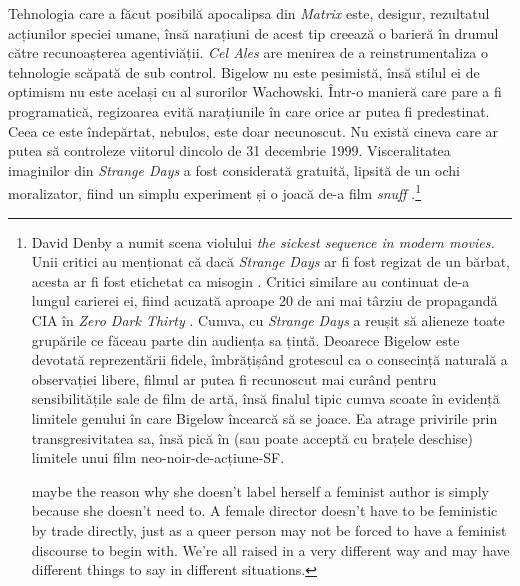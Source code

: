 \documentclass[12pt]{article}
\begin{document}
Tehnologia care a făcut posibilă apocalipsa din \textit{Matrix} este, desigur, rezultatul acțiunilor speciei umane, însă narațiuni de acest tip creează o barieră în drumul către recunoașterea agentiviății. \textit{Cel Ales} are menirea de a reinstrumentaliza o tehnologie scăpată de sub control. Bigelow nu este pesimistă, însă stilul ei de optimism nu este același cu al surorilor Wachowski. Într-o manieră care pare a fi programatică, regizoarea evită narațiunile în care orice ar putea fi predestinat. Ceea ce este îndepărtat, nebulos, este doar necunoscut. Nu există cineva care ar putea să controleze viitorul dincolo de 31 decembrie 1999. Visceralitatea imaginilor din \textit{Strange Days} a fost considerată gratuită, lipsită de un ochi moralizator, fiind un simplu experiment și o joacă de-a film \textit{snuff} \cite{Guthmann1995a, DenbyPeopleStrange1995}.\footnote{David Denby a numit scena violului \textit{the sickest sequence in modern movies.} Unii critici au menționat că dacă \textit{Strange Days} ar fi fost regizat de un bărbat, acesta ar fi fost etichetat ca misogin \cite{MirasolBigelowUncanny2010}. Critici similare au continuat de-a lungul carierei ei, fiind acuzată aproape 20 de ani mai târziu de propagandă CIA în \textit{Zero Dark Thirty} \cite{Vishnevetsky2012a}. Cumva, cu \textit{Strange Days} a reușit să alieneze toate grupările ce făceau parte din audiența sa țintă. Deoarece Bigelow este devotată reprezentării fidele, îmbrățișând grotescul ca o consecință naturală a observației libere, filmul ar putea fi recunoscut mai curând pentru sensibilitățile sale de film de artă, însă finalul tipic cumva scoate în evidență limitele genului în care Bigelow încearcă să se joace. Ea atrage privirile prin transgresivitatea sa, însă pică în (sau poate acceptă cu brațele deschise) limitele unui film neo-noir-de-acțiune-SF.\par

maybe the reason why she doesn't label herself a feminist author is simply because she doesn't need to. A female director doesn't have to be feministic by trade directly, just as a queer person may not be forced to have a feminist discourse to begin with. We're all raised in a very different way and may have different things to say in different situations. 

}
\end{document}
